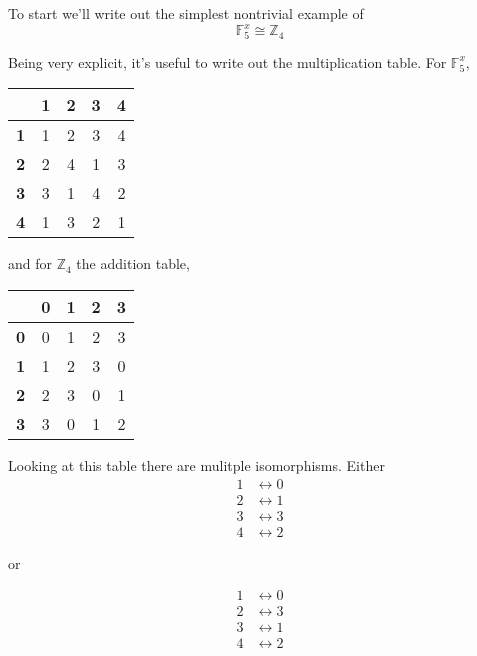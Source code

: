 \documentclass{article}
\begin{document}
To start we'll write out the simplest nontrivial example of
\begin{equation}
\mathbb{F}_{5}^{x} \cong \mathbb{Z}_{4}
\end{equation}

Being very explicit, it's useful to write out the multiplication table. For $ \mathbb{F}_{5}^{x} $,

\begin{table}
\begin{tabular}{ | c || c | c | c | c |}
\hline
   & \textbf{1} & \textbf{2} & \textbf{3} & \textbf{4} \\ \hline\hline
\textbf{1} & 1 & 2 & 3 & 4 \\ \hline
\textbf{2} & 2 & 4 & 1 & 3 \\ \hline
\textbf{3} & 3 & 1 & 4 & 2 \\ \hline
\textbf{4} & 1 & 3 & 2 & 1 \\ \hline
\end{tabular}
\end{table}

and for $ \mathbb{Z}_{4} $ the addition table,

\begin{table}
\begin{tabular}{ | c || c | c | c | c |}
\hline
   & \textbf{0} & \textbf{1} & \textbf{2} & \textbf{3} \\ \hline\hline
\textbf{0} & 0 & 1 & 2 & 3 \\ \hline
\textbf{1} & 1 & 2 & 3 & 0 \\ \hline
\textbf{2} & 2 & 3 & 0 & 1 \\ \hline
\textbf{3} & 3 & 0 & 1 & 2 \\ \hline
\end{tabular}
\end{table}

Looking at this table there are mulitple isomorphisms. Either
\begin{subequations}
\begin{align}
1 & \leftrightarrow 0 \\
2 & \leftrightarrow 1 \\
3 & \leftrightarrow 3 \\
4 & \leftrightarrow 2
\end{align}
\end{subequations}

or 

\begin{subequations}
\begin{align}
1 & \leftrightarrow 0 \\
2 & \leftrightarrow 3 \\
3 & \leftrightarrow 1 \\
4 & \leftrightarrow 2
\end{align}
\end{subequations}
\end{document}
